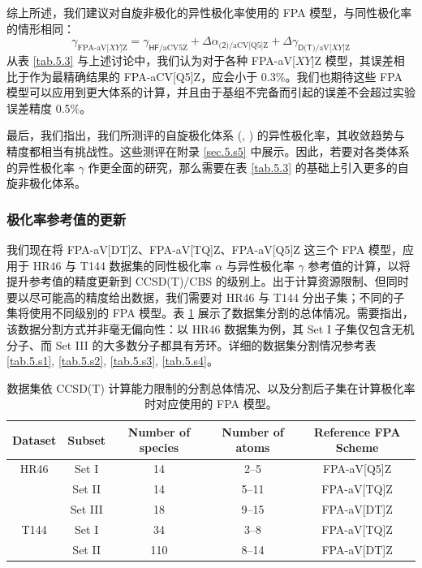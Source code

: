 综上所述，我们建议对自旋非极化的异性极化率使用的 FPA 模型，与同性极化率的情形相同：
\begin{equation}
    \label{eq.fpa-gamma}
    \gamma_{\text{FPA-aV[}XY\text{]Z}} = \gamma_{\textsf{HF}/\text{aCV5Z}} + \Delta \alpha_{\textsf{(2)}/\text{aCV[Q5]Z}} + \Delta \gamma_{\textsf{D(T)}/\text{aV[}XY\text{]Z}}
\end{equation}
从表 \ref{tab.5.3} 与上述讨论中，我们认为对于各种 FPA-aV[$XY$]Z 模型，其误差相比于作为最精确结果的 FPA-aCV[Q5]Z，应会小于 0.3\%。我们也期待这些 FPA 模型可以应用到更大体系的计算，并且由于基组不完备而引起的误差不会超过实验误差精度 0.5\%。

最后，我们指出，我们所测评的自旋极化体系 (, ) 的异性极化率，其收敛趋势与精度都相当有挑战性。这些测评在附录 \ref{sec.5.s5} 中展示。因此，若要对各类体系的异性极化率 $\gamma$ 作更全面的研究，那么需要在表 \ref{tab.5.3} 的基础上引入更多的自旋非极化体系。

\subsubsection{极化率参考值的更新}

我们现在将 FPA-aV[DT]Z、FPA-aV[TQ]Z、FPA-aV[Q5]Z 这三个 FPA 模型，应用于 HR46 与 T144 数据集的同性极化率 $\alpha$ 与异性极化率 $\gamma$ 参考值的计算，以将提升参考值的精度更新到 CCSD(T)/CBS 的级别上。出于计算资源限制、但同时要以尽可能高的精度给出数据，我们需要对 HR46 与 T144 分出子集；不同的子集将使用不同级别的 FPA 模型。表 \ref{tab.5.4} 展示了数据集分割的总体情况。需要指出，该数据分割方式并非毫无偏向性：以 HR46 数据集为例，其 Set I 子集仅包含无机分子、而 Set III 的大多数分子都具有芳环。详细的数据集分割情况参考表 \ref{tab.5.s1}, \ref{tab.5.s2}, \ref{tab.5.s3}, \ref{tab.5.s4}。

\begin{table}[ht]
    \centering
    \caption{数据集依 CCSD(T) 计算能力限制的分割总体情况、以及分割后子集在计算极化率时对应使用的 FPA 模型。}
    \label{tab.5.4}
    \begin{tabular}{ccccc}
    \hline
    Dataset & Subset  & Number of species & Number of atoms & Reference FPA Scheme \\ \hline
    HR46    & Set I   & 14                & 2--5            & FPA-aV[Q5]Z      \\
            & Set II  & 14                & 5--11           & FPA-aV[TQ]Z      \\
            & Set III & 18                & 9--15           & FPA-aV[DT]Z      \\
    T144    & Set I   & 34                & 3--8            & FPA-aV[TQ]Z      \\
            & Set II  & 110               & 8--14           & FPA-aV[DT]Z      \\ \hline
    \end{tabular}
\end{table}


